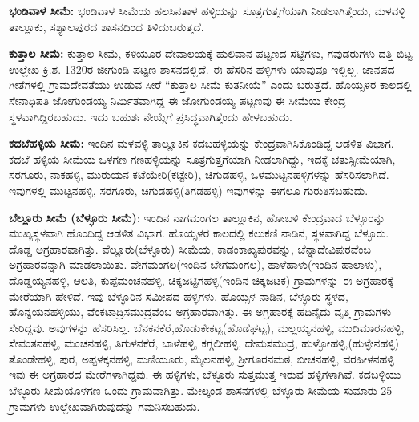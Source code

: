 \vskip 2pt

\textbf{ಭಂಡಿವಾಳ ಸೀಮೆ:} ಭಂಡಿವಾಳ ಸೀಮೆಯ ಹಲಸಿನತಾಳ ಹಳ್ಳಿಯನ್ನು ಸೂತ್ರಗುತ್ತಗೆಯಾಗಿ ನೀಡಲಾಗಿತ್ತೆಂದು, ಮಳವಳ್ಳಿ ತಾಲ್ಲೂಕು, ಸಶ್ಯಾಲಪುರದ ಶಾಸನದಿಂದ ತಿಳಿದುಬರುತ್ತದೆ.

\vskip 2pt

\textbf{ಕುತ್ತಾಲ ಸೀಮೆ:} ಕುತ್ತಾಲ ಸೀಮೆ, ಕಳಿಯೂರ ದೇವಾಲಯಕ್ಕೆ ಹುಲಿವಾನ ಪಟ್ಟಣದ ಸೆಟ್ಟಿಗಳು, ಗವುಡರುಗಳು ದತ್ತಿ ಬಿಟ್ಟ ಉಲ್ಲೇಖ ಕ್ರಿ.ಶ. 1320ರ ಜೀಗುಂಡಿ ಪಟ್ಟಣ ಶಾಸನದಲ್ಲಿದೆ. ಈ ಹೆಸರಿನ ಹಳ್ಳಿಗಳು ಯಾವುವೂ ಇಲ್ಲಿಲ್ಲ. ಜಾನಪದ ಗೀತೆಗಳಲ್ಲಿ ಗ್ರಾಮದೇವತೆಯು ಉಡುವ ಸೀರೆ “ಕುತ್ತಾಲ ಸೀಮೆ ಕುತನೀಯೆ” ಎಂದು ಬರುತ್ತದೆ. ಹೊಯ್ಸಳರ ಕಾಲದಲ್ಲಿ ಸೇನಾಧಿಪತಿ ಜೋಗುಂಡಯ್ಯ ನಿರ್ಮಿತವಾಗಿದ್ದ ಈ ಜೋಗುಂಡಯ್ಯ ಪಟ್ಟಣವು ಈ ಸೀಮೆಯ ಕೇಂದ್ರ ಸ್ಥಳವಾಗಿದ್ದಿರಬಹುದು. ಇದು ಬಹುಶಃ ನೇಯ್ಗೆಗೆ ಪ್ರಸಿದ್ಧವಾಗಿತ್ತೆಂದು ಹೇಳಬಹುದು.

\textbf{ಕದಬೆಹಳ್ಳಿಯ ಸೀಮೆ:} ಇಂದಿನ ಮಳವಳ್ಳಿ ತಾಲ್ಲೂಕಿನ ಕದಬಹಳ್ಳಿಯನ್ನು ಕೇಂದ್ರವಾಗಿಸಿಕೊಂಡಿದ್ದ ಆಡಳಿತ ವಿಭಾಗ. ಕದಬೆ ಹಳ್ಳಿಯ ಸೀಮೆಯ ಒಳಗಣ ಗಣಹಳ್ಳಿಯನ್ನು ಸೂತ್ರಗುತ್ತಗೆಯಾಗಿ ನೀಡಲಾಗಿದ್ದು, ಇದಕ್ಕೆ ಚತುಸ್ಸೀಮೆಯಾಗಿ, ಸರಗೂರು, ನಾಕಹಳ್ಳಿ, ಮುರುಯನ ಕಟೆಯೇರಿ(ಕಟ್ಟೇರಿ), ಚಿಗುಡಹಳ್ಳಿ, ಒಳಮುಟ್ಟನಹಳ್ಳಿಗಳನ್ನು ಹೆಸರಿಸಲಾಗಿದೆ. ಇವುಗಳಲ್ಲಿ ಮುಟ್ಟನಹಳ್ಳಿ, ಸರಗೂರು, ಚಿಗುಡಹಳ್ಳಿ(ತಿಗಡಹಳ್ಳಿ) ಇವುಗಳನ್ನು ಈಗಲೂ ಗುರುತಿಸಬಹುದು.

\textbf{ಬೆಲ್ಲೂರು ಸೀಮೆ (ಬೆಳ್ಳೂರು ಸೀಮೆ)}: ಇಂದಿನ ನಾಗಮಂಗಲ ತಾಲ್ಲೂಕಿನ, ಹೋಬಳಿ ಕೇಂದ್ರವಾದ ಬೆಳ್ಳೂರನ್ನು ಮುಖ್ಯಸ್ಥಳವಾಗಿ ಹೊಂದಿದ್ದ ಆಡಳಿತ ವಿಭಾಗ. ಹೊಯ್ಸಳರ ಕಾಲದಲ್ಲಿ ಕಲುಕಣಿ ನಾಡಿನ, ಸ್ಥಳವಾಗಿದ್ದ ಬೆಳ್ಳೂರು. ದೊಡ್ಡ ಅಗ್ರಹಾರವಾಗಿತ್ತು. ವೆಲ್ಲೂರು(ಬೆಳ್ಳೂರು) ಸೀಮೆಯ, ಕಾಡಂಕಾಖ್ಯಪುರವನ್ನು, ಚೆನ್ನಾದೇವಿಪುರವೆಂಬ ಅಗ್ರಹಾರವನ್ನಾಗಿ ಮಾಡಲಾಯಿತು. ವೇಗಮಂಗಲ(ಇಂದಿನ ಬೇಗಮಂಗಲ), ಹಾಳೆಹಾಳು(ಇಂದಿನ ಹಾಲಾಳು), ದೊಡ್ಡಯ್ಯನಹಳ್ಳಿ, ಆಲತಿ, ಕುಪ್ಪೆಮಂಚನಹಳ್ಳಿ, ಚಿಕ್ಕಜಟ್ಟಿಗಹಳ್ಳಿ(ಇಂದಿನ ಚಿಕ್ಕಜಟಕ) ಗ್ರಾಮಗಳನ್ನು ಈ ಅಗ್ರಹಾರಕ್ಕೆ ಮೇರೆಯಾಗಿ ಹೇಳಿದೆ. ಇವು ಬೆಳ್ಳೂರಿನ ಸಮೀಪದ ಹಳ್ಳಿಗಳು. ಹೊಯ್ಸಳ ನಾಡಿನ, ಬೆಳ್ಳೂರು ಸ್ಥಳದ, ಹೊನ್ನಯನಹಳ್ಳಿಯು, ವೆಂಕಟಾದ್ರಿಸಮುದ್ರವೆಂಬ ಅಗ್ರಹಾರವಾಗಿತ್ತು. ಈ ಅಗ್ರಹಾರಕ್ಕೆ ಹದಿನೈದು ವೃತ್ತಿ ಗ್ರಾಮಗಳು ಸೇರಿದ್ದವು. ಅವುಗಳನ್ನು ಹೆಸರಿಸಿಲ್ಲ. ಬೆನಕನಕೆರೆ,\break ಹೊಡುಕೇಕಟ್ಟ(ಹೊಡೆಘಟ್ಟ), ಮಲ್ಲಯ್ಯನಹಳ್ಳಿ, ಮುದಿಮಾರನಹಳ್ಳಿ, ಸೇವಂತನಹಳ್ಳಿ, ಮಂಚನಹಳ್ಳಿ, ತಿಗುಳನಕೆರೆ, ಬಾಳೆಹಳ್ಳಿ, ಕಗ್ಗಲೀಹಳ್ಳಿ, ದೇಮಸಮುದ್ರ, ಹುಳ್ಳೋಹಳ್ಳಿ,(ಹುಳ್ಳೇನಹಳ್ಳಿ) ತೊಂಡೇಹಳ್ಳಿ, ಪುರ, ಅಪ್ಪಳಕ್ಕನಹಳ್ಳಿ, ಮಣಿಯೂರು, ಮೈಲನಹಳ್ಳಿ, ಶ‍್ರೀಗೂರನಮಠ, ಬೀಚನಹಳ್ಳಿ, ವರಹೀಳನಹಳ್ಳಿ ಇವು ಈ ಅಗ್ರಹಾರದ ಮೇರೆಗಳಾಗಿದ್ದವು. ಈ ಹಳ್ಳಿಗಳು, ಬೆಳ್ಳೂರು ಸುತ್ತಮುತ್ತ ಇರುವ ಹಳ್ಳಿಗಳಾಗಿವೆ. ಕದಬಳ್ಳಿಯು ಬೆಳ್ಳೂರು ಸೀಮೆಯೊಳಗಣ ಒಂದು ಗ್ರಾಮವಾಗಿತ್ತು. ಮೇಲ್ಕಂಡ ಶಾಸನಗಳಲ್ಲಿ ಬೆಳ್ಳೂರು ಸೀಮೆಯ ಸುಮಾರು 25 ಗ್ರಾಮಗಳು ಉಲ್ಲೇಖವಾಗಿರುವುದನ್ನು ಗಮನಿಸಬಹುದು.

